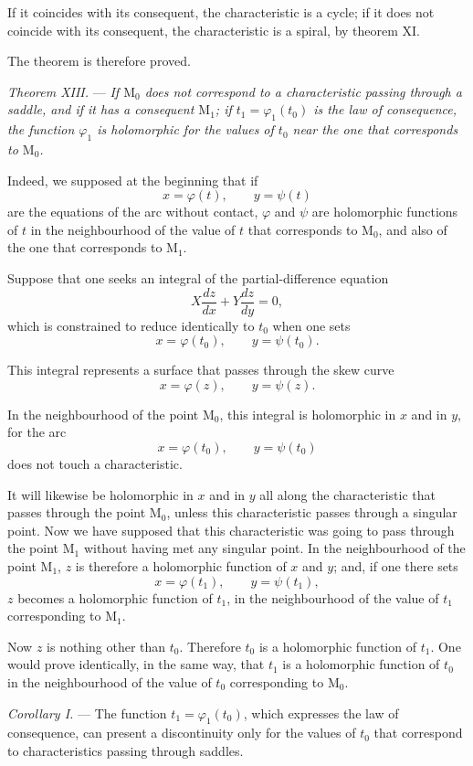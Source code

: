 \documentclass[11pt]{article}
\begin{document}
If it coincides with its consequent, the characteristic is a cycle; if it does not coincide with its consequent, the characteristic is a spiral, by theorem XI.

The theorem is therefore proved.

\emph{Theorem XIII.} --- \emph{If $\mathrm M_0$ does not correspond to a characteristic passing through a saddle, and if it has a consequent $\mathrm M_1$; if $t_1=\varphi_1(t_0)$ is the law of consequence, the function $\varphi_1$ is holomorphic for the values of $t_0$ near the one that corresponds to $\mathrm M_0$.}

Indeed, we supposed at the beginning that if
\[
x=\varphi(t),\qquad y=\psi(t)
\]
are the equations of the arc without contact, $\varphi$ and $\psi$ are holomorphic functions of $t$ in the neighbourhood of the value of $t$ that corresponds to $\mathrm M_0$, and also of the one that corresponds to $\mathrm M_1$.

Suppose that one seeks an integral of the partial-difference equation
\[
X\frac{dz}{dx}+Y\frac{dz}{dy}=0,
\]
which is constrained to reduce identically to $t_0$ when one sets
\[
x=\varphi(t_0),\qquad y=\psi(t_0).
\]

This integral represents a surface that passes through the skew curve
\[
x=\varphi(z),\qquad y=\psi(z).
\]

In the neighbourhood of the point $\mathrm M_0$, this integral is holomorphic in $x$ and in $y$, for the arc
\[
x=\varphi(t_0),\qquad y=\psi(t_0)
\]
does not touch a characteristic.

It will likewise be holomorphic in $x$ and in $y$ all along the characteristic that passes through the point $\mathrm M_0$, unless this characteristic passes through a singular point. Now we have supposed that this characteristic was going to pass through the point $\mathrm M_1$ without having met any singular point. In the neighbourhood of the point $\mathrm M_1$, $z$ is therefore a holomorphic function of $x$ and $y$; and, if one there sets
\[
x=\varphi(t_1),\qquad y=\psi(t_1),
\]
$z$ becomes a holomorphic function of $t_1$, in the neighbourhood of the value of $t_1$ corresponding to $\mathrm M_1$.

Now $z$ is nothing other than $t_0$. Therefore $t_0$ is a holomorphic function of $t_1$. One would prove identically, in the same way, that $t_1$ is a holomorphic function of $t_0$ in the neighbourhood of the value of $t_0$ corresponding to $\mathrm M_0$.

\emph{Corollary I.} --- The function $t_1=\varphi_1(t_0)$, which expresses the law of consequence, can present a discontinuity only for the values of $t_0$ that correspond to characteristics passing through saddles.
\end{document}
